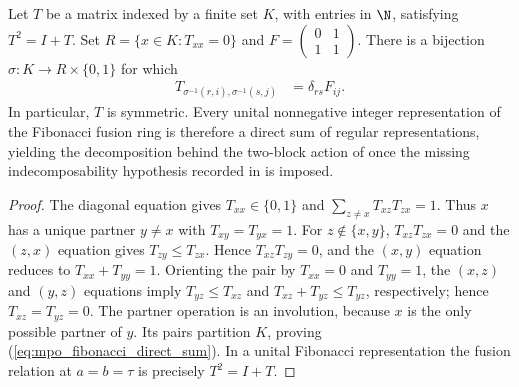 \begin{lemma}%
    \label{thm:mpo_symmetry_fibonacci_decomposition}
    \leanok
    Let $T$ be a matrix indexed by a finite set $K$, with entries in $\N$,
    satisfying $T^2=I+T$. Set $R=\{x\in K:T_{xx}=0\}$ and
    $F=\begin{pmatrix}0&1\\1&1\end{pmatrix}$. There is a bijection
    $\sigma:K\longrightarrow R\times\{0,1\}$ for which
    \begin{align}
        T_{\sigma^{-1}(r,i),\sigma^{-1}(s,j)}
         & =\delta_{rs}F_{ij}.
        \label{eq:mpo_fibonacci_direct_sum}
    \end{align}
    In particular, $T$ is symmetric. Every unital nonnegative integer
    representation of the Fibonacci fusion ring is therefore a direct sum
    of regular representations, yielding the decomposition behind the
    two-block action of \cite[Section~6]{GarreRubio2023MPOSym} once the
    missing indecomposability hypothesis recorded in
    \cite{gap:glm23_fibonacci_module_rank_scope} is imposed.
\end{lemma}

\begin{proof}
    \leanok
    The diagonal equation gives $T_{xx}\in\{0,1\}$ and
    $\sum_{z\ne x}T_{xz}T_{zx}=1$. Thus $x$ has a unique partner $y\ne x$
    with $T_{xy}=T_{yx}=1$. For $z\notin\{x,y\}$,
    $T_{xz}T_{zx}=0$ and the $(z,x)$ equation gives $T_{zy}\leq T_{zx}$.
    Hence $T_{xz}T_{zy}=0$, and the $(x,y)$ equation reduces to
    $T_{xx}+T_{yy}=1$. Orienting the pair by $T_{xx}=0$ and $T_{yy}=1$,
    the $(x,z)$ and $(y,z)$ equations imply
    $T_{yz}\leq T_{xz}$ and $T_{xz}+T_{yz}\leq T_{yz}$, respectively;
    hence $T_{xz}=T_{yz}=0$. The partner operation is an involution,
    because $x$ is the only possible partner of $y$. Its pairs partition
    $K$, proving (\ref{eq:mpo_fibonacci_direct_sum}). In a unital
    Fibonacci representation the fusion relation at $a=b=\tau$ is
    precisely $T^2=I+T$.
\end{proof}

